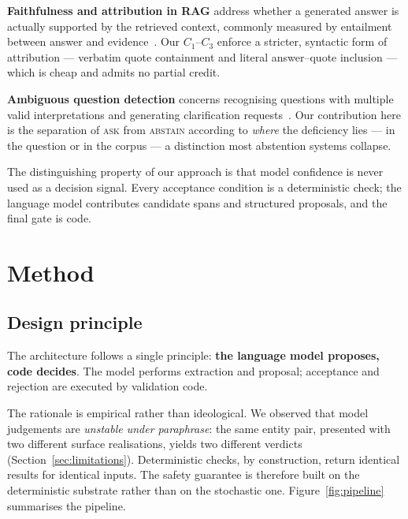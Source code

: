 \documentclass[conference]{IEEEtran}
\newcommand{\ACT}[1]{\textsc{#1}}
\begin{document}
\textbf{Faithfulness and attribution in RAG} address whether a generated answer is
actually supported by the retrieved context, commonly measured by entailment
between answer and evidence~\cite{rag,attribution}. Our $C_1$--$C_3$ enforce a
stricter, syntactic form of attribution --- verbatim quote containment and
literal answer--quote inclusion --- which is cheap and admits no partial credit.

\textbf{Ambiguous question detection} concerns recognising questions with multiple
valid interpretations and generating clarification requests~\cite{ambigqa}. Our
contribution here is the separation of \ACT{ask} from \ACT{abstain} according to
\emph{where} the deficiency lies --- in the question or in the corpus --- a
distinction most abstention systems collapse.

The distinguishing property of our approach is that model confidence is never
used as a decision signal. Every acceptance condition is a deterministic check;
the language model contributes candidate spans and structured proposals, and the
final gate is code.

\section{Method}

\subsection{Design principle}

The architecture follows a single principle: \textbf{the language model proposes,
code decides}. The model performs extraction and proposal; acceptance and
rejection are executed by validation code.

The rationale is empirical rather than ideological. We observed that model
judgements are \emph{unstable under paraphrase}: the same entity pair, presented
with two different surface realisations, yields two different verdicts
(Section~\ref{sec:limitations}). Deterministic checks, by construction, return
identical results for identical inputs. The safety guarantee is therefore built
on the deterministic substrate rather than on the stochastic one.
Figure~\ref{fig:pipeline} summarises the pipeline.
\end{document}
